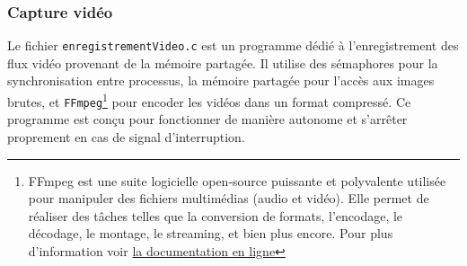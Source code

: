 \documentclass[a4paper, 11pt, french]{article}
\begin{document}
\subsubsection{Capture vidéo} \label{par:capture}

Le fichier \texttt{enregistrementVideo.c} est un programme dédié à l'enregistrement des flux vidéo provenant de la mémoire partagée. Il utilise des sémaphores pour la synchronisation entre processus, la mémoire partagée pour l'accès aux images brutes, et \texttt{FFmpeg}\footnote{FFmpeg est une suite logicielle open-source puissante et polyvalente utilisée pour manipuler des fichiers multimédias (audio et vidéo). Elle permet de réaliser des tâches telles que la conversion de formats, l'encodage, le décodage, le montage, le streaming, et bien plus encore. Pour plus d'information voir \href{https://ffmpeg.org/ffmpeg.html}{la documentation en ligne}} pour encoder les vidéos dans un format compressé. Ce programme est conçu pour fonctionner de manière autonome et s'arrêter proprement en cas de signal d'interruption.
\end{document}
